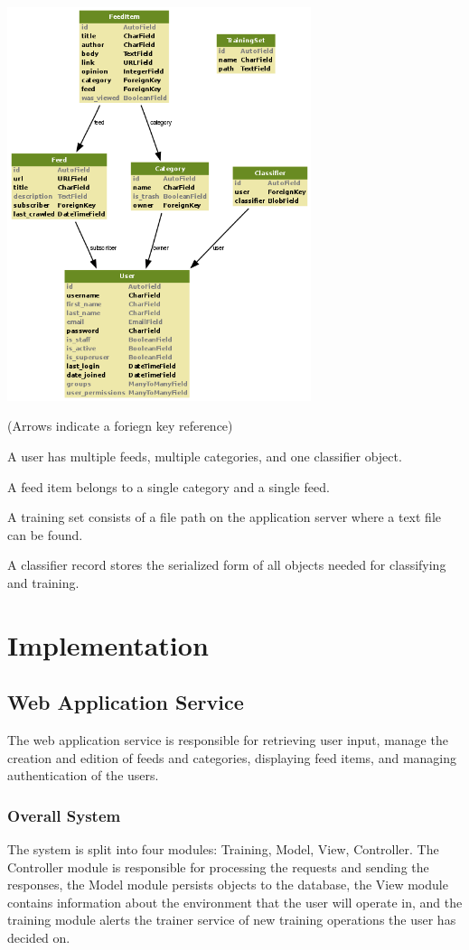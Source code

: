 \documentclass[letterpaper]{article}
\begin{document}
\noindent\includegraphics[width=3.5in]{db-diagram-no-transparency.png}

(Arrows indicate a foriegn key reference)

A user has multiple feeds, multiple categories, and one classifier object.

A feed item belongs to a single category and a single feed.

A training set consists of a file path on the application server where a text file can be found.

A classifier record stores the serialized form of all objects needed for classifying and training.

\section{Implementation}
\subsection{Web Application Service}
The web application service is responsible for retrieving user input, manage the creation and edition of feeds and categories, displaying feed items, and managing authentication of the users.

\subsubsection{Overall System}
The system is split into four modules: Training, Model, View, Controller.  The Controller module is responsible for processing the requests and sending the responses, the Model module persists objects to the database, the View module contains information about the environment that the user will operate in, and the training module alerts the trainer service of new training operations the user has decided on. 
\end{document}
